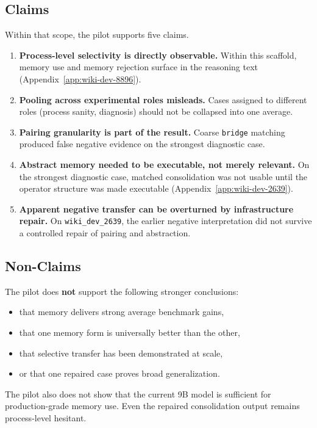 \documentclass[11pt]{article}
\begin{document}
\subsection{Claims}

Within that scope, the pilot supports five claims.

\begin{enumerate}
\item \textbf{Process-level selectivity is directly observable.} Within this scaffold, memory use and memory rejection surface in the reasoning text (Appendix~\ref{app:wiki-dev-8896}).
\item \textbf{Pooling across experimental roles misleads.} Cases assigned to different roles (process sanity, diagnosis) should not be collapsed into one average.
\item \textbf{Pairing granularity is part of the result.} Coarse \texttt{bridge} matching produced false negative evidence on the strongest diagnostic case.
\item \textbf{Abstract memory needed to be executable, not merely relevant.} On the strongest diagnostic case, matched consolidation was not usable until the operator structure was made executable (Appendix~\ref{app:wiki-dev-2639}).
\item \textbf{Apparent negative transfer can be overturned by infrastructure repair.} On \texttt{wiki\_dev\_2639}, the earlier negative interpretation did not survive a controlled repair of pairing and abstraction.
\end{enumerate}

\subsection{Non-Claims}

The pilot does \textbf{not} support the following stronger conclusions:

\begin{itemize}
\item that memory delivers strong average benchmark gains,
\item that one memory form is universally better than the other,
\item that selective transfer has been demonstrated at scale,
\item or that one repaired case proves broad generalization.
\end{itemize}

The pilot also does not show that the current 9B model is sufficient for production-grade memory use. Even the repaired consolidation output remains process-level hesitant.
\end{document}
